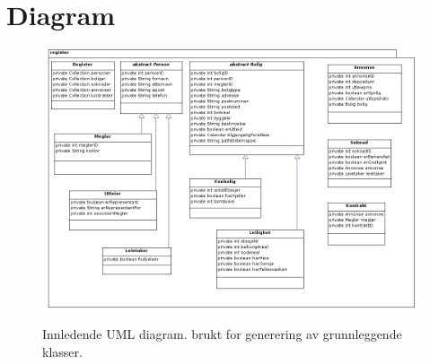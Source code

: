 \appendix
\chapter{Diagram} \label{appendix:diagram}

\begin{figure}[ht]
 \includegraphics[angle=90 ,width=\textwidth,height=\textheight,keepaspectratio]{./img/appendix/diagram/klassestruktur_uml.png}
 \caption{Innledende UML diagram. brukt for generering av grunnleggende klasser.}
 \label{fig:uml_diag}
\end{figure}
